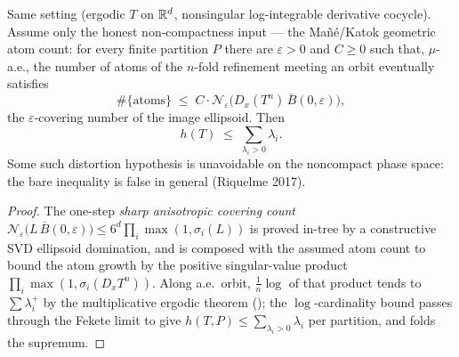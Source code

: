 \begin{theorem}\label{margulisRuelle_sharp}
  \leanok
  Same setting (ergodic \(T\) on \(\mathbb{R}^d\), nonsingular log-integrable derivative cocycle). Assume
  only the honest non-compactness input --- the Ma\~n\'e/Katok geometric atom count: for every
  finite partition \(P\) there are \(\varepsilon>0\) and \(C\ge 0\) such that, \(\mu\)-a.e.,
  the number of atoms of the \(n\)-fold refinement meeting an orbit eventually satisfies
  \[
    \#\{\text{atoms}\} \;\le\; C\cdot
      \mathcal N_\varepsilon\bigl(D_x(T^{n})\,\overline B(0,\varepsilon)\bigr),
  \]
  the \(\varepsilon\)-covering number of the image ellipsoid. Then
  \[
    h(T) \;\le\; \sum_{\lambda_i>0}\lambda_i.
  \]
  Some such distortion hypothesis is unavoidable on the noncompact phase space: the bare
  inequality is false in general (Riquelme 2017).
\end{theorem}
\begin{proof}\leanok
  The one-step \emph{sharp anisotropic covering count}
  \(\mathcal N_\varepsilon\bigl(L\,\overline B(0,\varepsilon)\bigr)\le 6^d\prod_i\max(1,\sigma_i(L))\)
  is proved in-tree by a constructive SVD ellipsoid domination, and is composed with the assumed
  atom count to bound the atom growth by the positive singular-value product
  \(\prod_i\max(1,\sigma_i(D_xT^{n}))\). Along a.e.\ orbit, \(\frac1n\log\) of that product tends
  to \(\sum\lambda_i^{+}\) by the multiplicative ergodic theorem
  (); the \(\log\)-cardinality bound passes through the Fekete limit
  to give \(h(T,P)\le\sum_{\lambda_i>0}\lambda_i\) per partition, and
   folds the supremum.
\end{proof}

